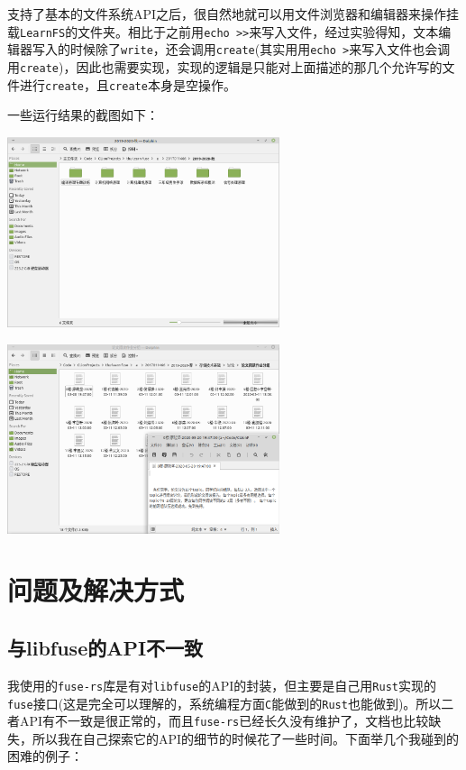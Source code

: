 \documentclass[12pt, UTF8]{article}
\begin{document}
支持了基本的文件系统API之后，很自然地就可以用文件浏览器和编辑器来操作挂载\lstinline|LearnFS|的文件夹。相比于之前用\lstinline|echo >>|来写入文件，经过实验得知，文本编辑器写入的时候除了\lstinline|write|，还会调用\lstinline|create|(其实用用\lstinline|echo >|来写入文件也会调用\lstinline|create|)，因此也需要实现，实现的逻辑是只能对上面描述的那几个允许写的文件进行\lstinline|create|，且\lstinline|create|本身是空操作。

一些运行结果的截图如下：

\newpage

\begin{center}
  \includegraphics[width=0.6\textwidth]{1.png}
\end{center}

\begin{center}
  \includegraphics[width=0.6\textwidth]{2.png}
\end{center}

\section{问题及解决方式}

\subsection{与libfuse的API不一致}

我使用的\lstinline|fuse-rs|库是有对\lstinline|libfuse|的API的封装，但主要是自己用\lstinline|Rust|实现的\lstinline|fuse|接口(这是完全可以理解的，系统编程方面\lstinline|C|能做到的\lstinline|Rust|也能做到)。所以二者API有不一致是很正常的，而且\lstinline|fuse-rs|已经长久没有维护了，文档也比较缺失，所以我在自己探索它的API的细节的时候花了一些时间。下面举几个我碰到的困难的例子：
\end{document}
